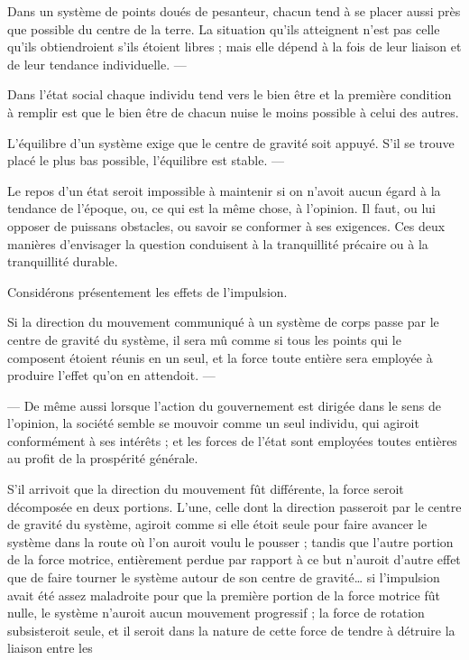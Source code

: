 \documentclass[11pt,a4paper]{article}
\begin{document}
Dans un système de points doués de pesanteur, chacun tend à se placer aussi
près que possible du centre de la terre. La situation qu'ils atteignent
n'est pas celle qu'ils obtiendroient s'ils étoient libres ; mais elle dépend
à la fois de leur liaison et de leur tendance individuelle. ---

Dans l'état social chaque individu tend vers le bien être et la première
condition à remplir est que le bien être de chacun nuise le moins possible à
celui des autres.

L'équilibre d'un système exige que le centre de gravité soit appuyé. S'il se
trouve placé le plus bas possible, l'équilibre est stable. ---

Le repos d'un état seroit impossible à maintenir si on n'avoit aucun égard à
la tendance de l'époque, ou, ce qui est la même chose, à l'opinion. Il faut,
ou lui opposer de puissans obstacles, ou savoir se conformer à ses
exigences. Ces deux manières d'envisager la question conduisent à la
tranquillité précaire ou à la tranquillité durable.

Considérons présentement les effets de l'impulsion.

Si la direction du mouvement communiqué à un système de corps passe par le
centre de gravité du système, il sera mû comme si tous les points qui le
composent étoient réunis en un seul, et la force toute entière sera employée
à produire l'effet qu'on en attendoit. ---

--- De même aussi lorsque l'action du gouvernement est dirigée dans le sens
de l'opinion, la société semble se mouvoir comme un seul individu, qui
agiroit conformément à ses intérêts ; et les forces de l'état sont employées
toutes entières au profit de la prospérité générale.

S'il arrivoit que la direction du mouvement fût différente, la force seroit
décomposée en deux portions. L'une, celle dont la direction passeroit par le
centre de gravité du système, agiroit comme si elle étoit seule pour faire
avancer le système dans la route où l'on auroit voulu le pousser ; tandis que
l'autre portion de la force motrice, entièrement perdue par rapport à ce but
n'auroit d'autre effet que de faire tourner le système autour de son centre
de gravité\ldots{}  si  l'impulsion
 avait été assez
maladroite pour que la première portion de la force motrice fût nulle, le
système n'auroit aucun mouvement progressif ; la force de rotation
subsisteroit seule, et il seroit dans la nature de cette force
 de tendre à détruire la liaison entre les
\end{document}
